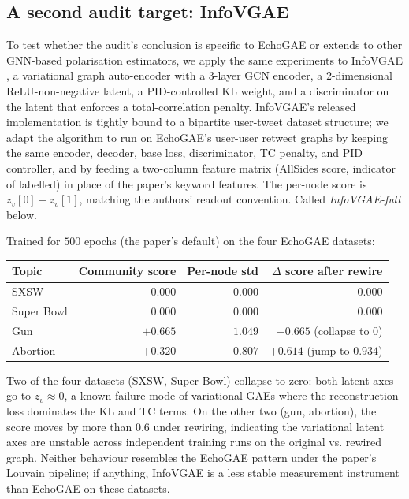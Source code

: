 \subsection{A second audit target: InfoVGAE}\label{sec:emp-infovgae}

To test whether the audit's conclusion is specific to EchoGAE or
extends to other GNN-based polarisation estimators, we apply the
same experiments to InfoVGAE \citep{Li22InfoVGAE}, a variational
graph auto-encoder with a $3$-layer GCN encoder, a $2$-dimensional
ReLU-non-negative latent, a PID-controlled KL weight, and a
discriminator on the latent that enforces a total-correlation
penalty. InfoVGAE's released implementation is tightly bound to a
bipartite user-tweet dataset structure; we adapt the algorithm to
run on EchoGAE's user-user retweet graphs by keeping the same
encoder, decoder, base loss, discriminator, TC penalty, and PID
controller, and by feeding a two-column feature matrix (AllSides
score, indicator of labelled) in place of the paper's keyword
features. The per-node score is $z_v[0] - z_v[1]$, matching the
authors' readout convention. Called \emph{InfoVGAE-full} below.

Trained for $500$ epochs (the paper's default) on the four EchoGAE
datasets:

\begin{center}
\begin{tabular}{lrrr}
\hline
Topic & Community score & Per-node std & $\Delta$ score after rewire \\
\hline
SXSW       & $0.000$   & $0.000$ & $0.000$ \\
Super Bowl & $0.000$   & $0.000$ & $0.000$ \\
Gun        & $+0.665$  & $1.049$ & $-0.665$ (collapse to $0$) \\
Abortion   & $+0.320$  & $0.807$ & $+0.614$ (jump to $0.934$) \\
\hline
\end{tabular}
\end{center}

Two of the four datasets (SXSW, Super Bowl) collapse to zero:
both latent axes go to $z_v \approx 0$, a known failure mode of
variational GAEs where the reconstruction loss dominates the KL
and TC terms. On the other two (gun, abortion), the score moves
by more than $0.6$ under rewiring, indicating the variational
latent axes are unstable across independent training runs on the
original vs. rewired graph. Neither behaviour resembles the
EchoGAE pattern under the paper's Louvain pipeline; if anything,
InfoVGAE is a less stable measurement instrument than EchoGAE on
these datasets.

